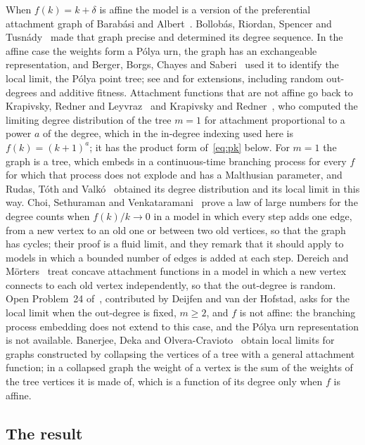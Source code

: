 \documentclass[11pt]{amsart}
\theoremstyle{definition}
\begin{document}
When $f(k)=k+\delta$ is affine the model is a version of the preferential attachment graph of Barab\'asi and
Albert~\cite{BA}. Bollob\'as, Riordan, Spencer and Tusn\'ady~\cite{BRST} made that graph precise and determined
its degree sequence. In the affine case the weights
form a P\'olya urn, the graph has an exchangeable representation,
and Berger, Borgs, Chayes and Saberi~\cite{BBCS} used it to identify the local limit, the P\'olya point tree;
see \cite{GHHR,Lo} and \cite[Chapter~5]{vdH2} for extensions, including random out-degrees and additive fitness.
Attachment functions that are not affine go back to Krapivsky, Redner and Leyvraz~\cite{KRL} and Krapivsky and
Redner~\cite{KR}, who computed the limiting degree distribution of the tree $m=1$ for attachment proportional to a
power $a$ of the degree, which in the in-degree indexing used here is $f(k)=(k+1)^{a}$; it has the
product form of~\eqref{eq:pk} below. For $m=1$ the graph is a
tree, which embeds in a continuous-time branching process for every $f$ for which that process does not explode
and has a Malthusian parameter, and Rudas, T\'oth and
Valk\'o~\cite{RTV} obtained its degree distribution and its local limit in this way. Choi, Sethuraman and
Venkataramani~\cite{CSV} prove a law of large numbers for the degree counts when $f(k)/k\to0$ in a model in which
every step adds one edge, from a new vertex to an old one or between two old vertices, so that the graph has cycles;
their proof is a fluid limit, and they remark that it should apply to models in which a bounded number of edges is
added at each step. Dereich and M\"orters~\cite{DM1,DM2} treat concave
attachment functions in a model in which a new vertex connects to each old vertex independently, so
that the out-degree is random. Open Problem~24 of~\cite{Aletti}, contributed by Deijfen and van der Hofstad,
asks for the local limit when the out-degree is fixed, $m\ge2$, and $f$ is not affine: the branching process
embedding does not extend to this case, and the P\'olya urn representation is not available. Banerjee, Deka and
Olvera-Cravioto~\cite{BDO} obtain local limits for graphs constructed by collapsing the vertices of a tree with a
general attachment function; in a collapsed graph the weight of a vertex is the sum of the weights of the tree
vertices it is made of, which is a function of its degree only when $f$ is affine.

\subsection{The result}
\end{document}
